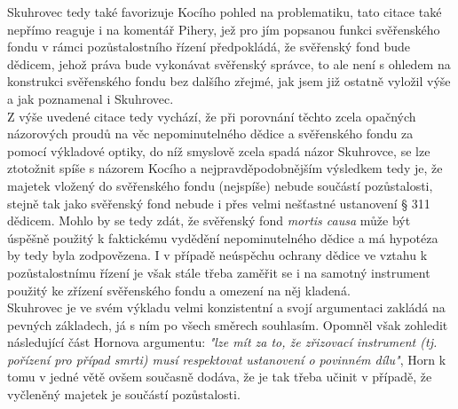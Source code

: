 \documentclass{article}
\begin{document}
 Skuhrovec tedy také favorizuje Kocího pohled na problematiku, tato citace také nepřímo reaguje i na komentář Pihery, jež pro jím popsanou funkci svěřenského fondu v rámci pozůstalostního řízení předpokládá, že svěřenský fond bude dědicem, jehož práva bude vykonávat svěřenský správce, to ale není s ohledem na konstrukci svěřenského fondu bez dalšího zřejmé, jak jsem již ostatně vyložil výše a jak poznamenal i Skuhrovec.\\
 
Z výše uvedené citace tedy vychází, že při porovnání těchto zcela opačných názorových proudů na věc nepominutelného dědice a svěřenského fondu za pomocí výkladové optiky, do níž smyslově zcela spadá názor Skuhrovce, se lze ztotožnit spíše s názorem Kocího a nejpravděpodobnějším výsledkem tedy je, že majetek vložený do svěřenského fondu (nejspíše) nebude součástí pozůstalosti, stejně tak jako svěřenský fond nebude i přes velmi nešťastné ustanovení § 311 dědicem. Mohlo by se tedy zdát, že svěřenský fond \textit{mortis causa} může být úspěšně použitý k faktickému vydědění nepominutelného dědice a má hypotéza by tedy byla zodpovězena. I v případě neúspěchu ochrany dědice ve vztahu k pozůstalostnímu řízení je však stále třeba zaměřit se i na samotný instrument použitý ke zřízení svěřenského fondu a omezení na něj kladená.\\


 
 Skuhrovec je ve svém výkladu velmi konzistentní a svojí argumentaci zakládá na pevných základech, já s ním po všech směrech souhlasím. Opomněl však zohledit následující část Hornova argumentu: \textit{"lze mít za to, že zřizovací instrument (tj. pořízení pro případ smrti) musí respektovat ustanovení o povinném dílu"}, Horn k tomu v jedné větě ovšem současně dodáva, že je tak třeba učinit v případě, že vyčleněný majetek je součástí pozůstalosti.\\ 
 
\end{document}
